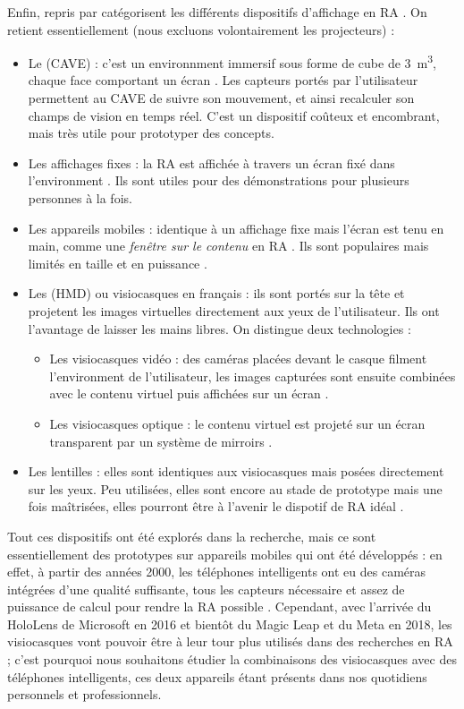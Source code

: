 Enfin, \cite{Buxton1998} repris par \cite{Bimber2005} catégorisent les différents dispositifs d'affichage en RA . On retient essentiellement (nous excluons volontairement les projecteurs) :
\begin{itemize}
  \item Le  (CAVE) : c'est un environnment immersif sous forme de cube de \SI{3}{\m^{3}}, chaque face comportant un écran . Les capteurs portés par l'utilisateur permettent au CAVE de suivre son mouvement, et ainsi recalculer son champs de vision en temps réel. C'est un dispositif coûteux et encombrant, mais très utile pour prototyper des concepts.
  \item Les affichages fixes : la RA est affichée à travers un écran fixé dans l'environment . Ils sont utiles pour des démonstrations pour plusieurs personnes à la fois.
  \item Les appareils mobiles : identique à un affichage fixe mais l'écran est tenu en main, comme une \emph{fenêtre sur le contenu} en RA . Ils sont populaires mais limités en taille et en puissance \citep{Huang2013}.
  \item Les  (HMD) ou visiocasques en français : ils sont portés sur la tête et projetent les images virtuelles directement aux yeux de l'utilisateur. Ils ont l'avantage de laisser les mains libres. On distingue deux technologies :
  \begin{itemize}
    \item Les visiocasques vidéo : des caméras placées devant le casque filment l'environment de l'utilisateur, les images capturées sont ensuite combinées avec le contenu virtuel puis affichées sur un écran .
    \item Les visiocasques optique : le contenu virtuel est projeté sur un écran transparent par un système de mirroirs .
  \end{itemize}
  \item Les lentilles : elles sont identiques aux visiocasques mais posées directement sur les yeux. Peu utilisées, elles sont encore au stade de prototype mais une fois maîtrisées, elles pourront être à l'avenir le dispotif de RA idéal \citep{VanKrevelen2010}.
\end{itemize}

Tout ces dispositifs ont été explorés dans la recherche, mais ce sont essentiellement des prototypes sur appareils mobiles qui ont été développés : en effet, à partir des années 2000, les téléphones intelligents ont eu des caméras intégrées d'une qualité suffisante, tous les capteurs nécessaire et assez de puissance de calcul pour rendre la RA possible \citep{Huang2013}. Cependant, avec l'arrivée du HoloLens de Microsoft en 2016 et bientôt du Magic Leap et du Meta en 2018, les visiocasques vont pouvoir être à leur tour plus utilisés dans des recherches en RA ; c'est pourquoi nous souhaitons étudier la combinaisons des visiocasques avec des téléphones intelligents, ces deux appareils  étant présents dans nos quotidiens personnels et professionnels.

